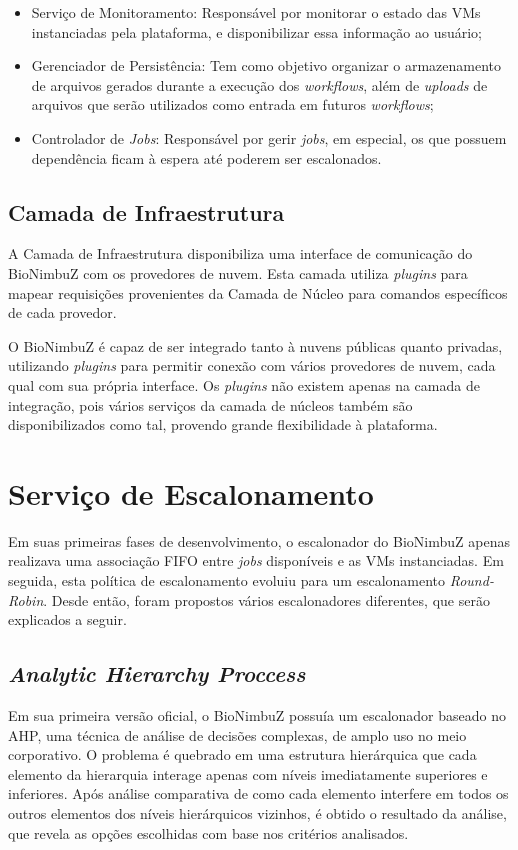 \begin{itemize}
		\item Serviço de Monitoramento: Responsável por monitorar o estado das \acrshort{VM}s instanciadas pela plataforma, e disponibilizar essa informação ao usuário;
		\item Gerenciador de Persistência: Tem como objetivo organizar o armazenamento de arquivos gerados durante a execução dos \textit{workflows}, além de \textit{uploads} de arquivos que serão utilizados como entrada em futuros \textit{workflows};
		\item Controlador de \textit{Jobs}: Responsável por gerir \textit{jobs}, em especial, os que possuem dependência ficam à espera até poderem ser escalonados.

	
	\end{itemize}
	
	\subsection{Camada de Infraestrutura} A Camada de Infraestrutura disponibiliza uma interface de comunicação do BioNimbuZ com os provedores de nuvem. Esta camada utiliza \textit{plugins} para mapear requisições provenientes da Camada de Núcleo para comandos específicos de cada provedor.

O BioNimbuZ é capaz de ser integrado tanto à nuvens públicas quanto privadas, utilizando \textit{plugins} para permitir conexão com vários provedores de nuvem, cada qual com sua própria interface. Os \textit{plugins} não existem apenas na camada de integração, pois vários serviços da camada de núcleos também são disponibilizados como tal, provendo grande flexibilidade à plataforma.


\section{Serviço de Escalonamento}

Em suas primeiras fases de desenvolvimento, o escalonador do BioNimbuZ apenas realizava uma associação \acrfull{FIFO} entre \textit{jobs} disponíveis e as \acrshort{VM}s instanciadas. Em seguida, esta política de escalonamento evoluiu para um escalonamento \textit{Round-Robin}. Desde então, foram propostos vários escalonadores diferentes, que serão explicados a seguir.

\subsection{\textit{Analytic Hierarchy Proccess}}
Em sua primeira versão oficial, o BioNimbuZ possuía um escalonador baseado no \acrfull{AHP}\cite{6732620_BioNimbuZ_ACOsched}, uma técnica de análise de decisões complexas, de amplo uso no meio corporativo. O problema é quebrado em uma estrutura hierárquica que cada elemento da hierarquia interage apenas com níveis imediatamente superiores e inferiores. Após análise comparativa de como cada elemento interfere em todos os outros elementos dos níveis hierárquicos vizinhos, é obtido o resultado da análise, que revela as opções escolhidas com base nos critérios analisados.

